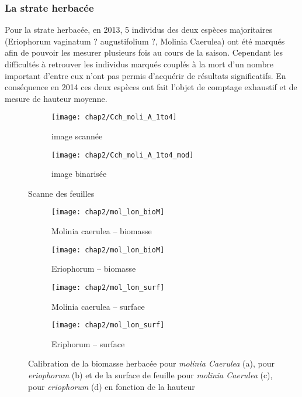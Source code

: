 \subsubsection{La strate herbacée}
Pour la strate herbacée, en 2013, 5 individus des deux espèces majoritaires (Eriophorum vaginatum ? augustifolium ?, Molinia Caerulea) ont été marqués afin de pouvoir les mesurer plusieurs fois au cours de la saison.
Cependant les difficultés à retrouver les individus marqués couplés à la mort d'un nombre important d'entre eux n'ont pas permis d'acquérir de résultats significatifs.
En conséquence en 2014 ces deux espèces ont fait l'objet de comptage exhaustif et de mesure de hauteur moyenne.


\begin{figure}
	\centering
	\begin{subfigure}[t]{0.5\textwidth}
		\centering
		\texttt{[image: chap2/Cch\_moli\_A\_1to4]}
		\caption{image scannée}
	\end{subfigure}%
	\begin{subfigure}[t]{0.5\textwidth}
		\centering
		\texttt{[image: chap2/Cch\_moli\_A\_1to4\_mod]}
		\caption{image binarisée}
	\end{subfigure}
\caption{Scanne des feuilles}
\label{fig:scan_mol}
\end{figure}


\begin{figure}
	\centering
	\begin{subfigure}[t]{0.5\textwidth}
		\centering
		\texttt{[image: chap2/mol\_lon\_bioM]}
		\caption{Molinia caerulea -- biomasse}
	\end{subfigure}%
	\begin{subfigure}[t]{0.5\textwidth}
		\centering
		\texttt{[image: chap2/mol\_lon\_bioM]}
		\caption{Eriophorum -- biomasse}
	\end{subfigure}
	
	
	\begin{subfigure}[t]{0.5\textwidth}
		\centering
		\texttt{[image: chap2/mol\_lon\_surf]}
		\caption{Molinia caerulea -- surface}
	\end{subfigure}%
	\begin{subfigure}[t]{0.5\textwidth}
		\centering
		\texttt{[image: chap2/mol\_lon\_surf]}
		\caption{Eriphorum -- surface}
	\end{subfigure}
\caption{Calibration de la biomasse herbacée pour \textit{molinia Caerulea} (a), pour \textit{eriophorum} (b) et de la surface de feuille pour \textit{molinia Caerulea} (c), pour \textit{eriophorum} (d) en fonction de la hauteur}
\label{fig:cal_herb}
\end{figure}









%
%






\clearpage
